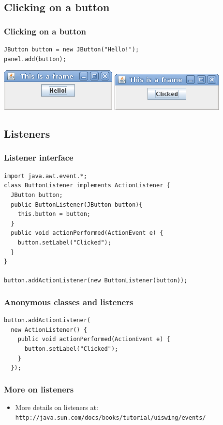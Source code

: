 \documentclass[10pt, handout]{beamer}
\begin{document}
\subsection{Clicking on a button}
\begin{frame}[fragile]
  \frametitle{Clicking on a button}
\begin{verbatim}
JButton button = new JButton("Hello!");
panel.add(button);
\end{verbatim}
\begin{center}
  \includegraphics[width=0.38\linewidth]{beforeClick}
  \includegraphics[width=0.4\linewidth]{afterClick}
\end{center}
\end{frame}

\subsection{Listeners}
\begin{frame}[fragile]
  \frametitle{Listener interface}
\begin{verbatim}
import java.awt.event.*;
class ButtonListener implements ActionListener {
  JButton button;
  public ButtonListener(JButton button){
    this.button = button;
  }
  public void actionPerformed(ActionEvent e) {
    button.setLabel("Clicked");
  }
}

button.addActionListener(new ButtonListener(button));
\end{verbatim}
\end{frame}

\begin{frame}[fragile]
  \frametitle{Anonymous classes and listeners}
\begin{verbatim}
button.addActionListener(
  new ActionListener() {
    public void actionPerformed(ActionEvent e) {
      button.setLabel("Clicked");
    }
  });
\end{verbatim}
\end{frame}

\begin{frame}
  \frametitle{More on listeners}
  \begin{itemize}
    \item More details on listeners at:
      \verb!http://java.sun.com/docs/books/tutorial/uiswing/events/!
  \end{itemize}
\end{frame}
\end{document}

